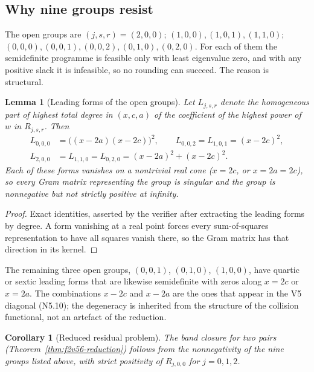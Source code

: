 \documentclass[11pt]{article}
\newtheorem{lemma}[theorem]{Lemma}
\newtheorem{corollary}[theorem]{Corollary}
\theoremstyle{definition}
\theoremstyle{remark}
\begin{document}
\subsection{Why nine groups resist}

The open groups are \((j,s,r)=(2,0,0)\); \((1,0,0),(1,0,1),(1,1,0)\);
\((0,0,0),(0,0,1),(0,0,2),(0,1,0),(0,2,0)\).  For each of them the
semidefinite programme is feasible only with least eigenvalue zero, and
with any positive slack it is infeasible, so no rounding can succeed.
The reason is structural.

\begin{lemma}[Leading forms of the open groups]
\label{lem:f2v57-leading}
Let \(L_{j,s,r}\) denote the homogeneous part of highest total degree in
\((x,c,a)\) of the coefficient of the highest power of \(w\) in
\(R_{j,s,r}\).  Then
\begin{equation}
\begin{aligned}
 L_{0,0,0}&=\bigl((x-2a)(x-2c)\bigr)^2,\qquad
 L_{0,0,2}=L_{1,0,1}=(x-2c)^2,\\
 L_{2,0,0}&=L_{1,1,0}=L_{0,2,0}=(x-2a)^2+(x-2c)^2 .
\end{aligned}
\label{eq:f2v57-leading}
\end{equation}
Each of these forms vanishes on a nontrivial real cone (\(x=2c\), or
\(x=2a=2c\)), so every Gram matrix representing the group is singular
and the group is nonnegative but not strictly positive at infinity.
\end{lemma}

\begin{proof}
Exact identities, asserted by the verifier after extracting the leading
forms by degree.  A form vanishing at a real point forces every
sum-of-squares representation to have all squares vanish there, so the
Gram matrix has that direction in its kernel.
\end{proof}

The remaining three open groups, \((0,0,1)\), \((0,1,0)\), \((1,0,0)\),
have quartic or sextic leading forms that are likewise semidefinite with
zeros along \(x=2c\) or \(x=2a\).  The combinations \(x-2c\) and
\(x-2a\) are the ones that appear in the V5 diagonal
\textup{(N5.10)}; the degeneracy is inherited from the structure of the
collision functional, not an artefact of the reduction.

\begin{corollary}[Reduced residual problem]
\label{cor:f2v57-residual}
The band closure for two pairs (Theorem~\ref{thm:f2v56-reduction})
follows from the nonnegativity of the nine groups listed above, with
strict positivity of \(R_{j,0,0}\) for \(j=0,1,2\).
\end{corollary}
\end{document}
